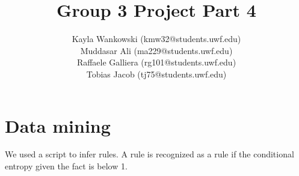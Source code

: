 \documentclass{article}
\begin{document}
\title{Group 3 Project Part 4}
\author{
    Kayla Wankowski (kmw32@students.uwf.edu)\\
    Muddasar Ali (ma229@students.uwf.edu)\\
    Raffaele Galliera (rg101@students.uwf.edu)\\
    Tobias Jacob (tj75@students.uwf.edu)
}

\maketitle

\section{Data mining}

We used a script to infer rules.
A rule is recognized as a rule if the conditional entropy given the fact is below 1.
\end{document}
